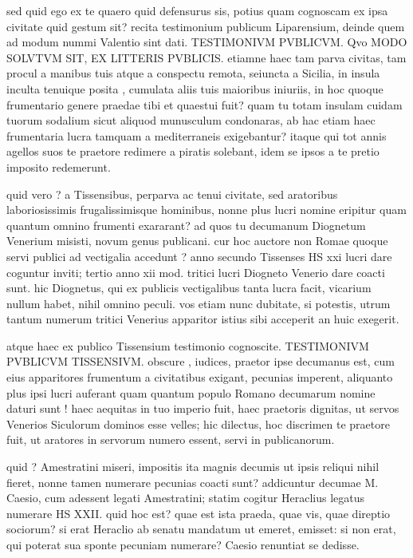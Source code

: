  sed quid ego ex te quaero quid defensurus sis, potius quam cognoscam ex ipsa civitate quid gestum sit? recita testimonium publicum Liparensium, deinde quem ad modum nummi Valentio sint dati. TESTIMONIVM PVBLICVM. Qvo MODO SOLVTVM SIT, EX LITTERIS PVBLICIS. etiamne haec tam parva civitas, tam procul a manibus tuis atque a conspectu remota, seiuncta a Sicilia, in insula inculta tenuique posita , cumulata aliis tuis maioribus iniuriis, in hoc quoque frumentario genere praedae tibi et quaestui fuit? quam tu totam insulam cuidam tuorum sodalium sicut aliquod munusculum condonaras, ab hac etiam haec frumentaria lucra tamquam a mediterraneis exigebantur? itaque qui tot annis agellos suos te praetore redimere a piratis solebant, idem se ipsos a te pretio imposito redemerunt.

 quid vero ? a Tissensibus, perparva ac tenui civitate, sed aratoribus laboriosissimis frugalissimisque hominibus, nonne plus lucri nomine eripitur quam quantum omnino frumenti exararant? ad quos tu decumanum Diognetum Venerium misisti, novum genus publicani. cur hoc auctore non Romae quoque servi publici ad vectigalia accedunt ? anno secundo Tissenses HS xxi lucri dare coguntur inviti; tertio anno xii mod. tritici lucri Diogneto Venerio dare coacti sunt. hic Diognetus, qui ex publicis vectigalibus tanta lucra facit, vicarium nullum habet, nihil omnino peculi. vos etiam nunc dubitate, si potestis, utrum tantum numerum tritici Venerius apparitor istius sibi acceperit an huic exegerit.

 atque haec ex publico Tissensium testimonio cognoscite. TESTIMONIVM PVBLICVM TISSENSIVM. obscure , iudices, praetor ipse decumanus est, cum eius apparitores frumentum a civitatibus exigant, pecunias imperent, aliquanto plus ipsi lucri auferant quam quantum populo Romano decumarum nomine daturi sunt ! haec aequitas in tuo imperio fuit, haec praetoris dignitas, ut servos Venerios Siculorum dominos esse velles; hic dilectus, hoc discrimen te praetore fuit, ut aratores in servorum numero essent, servi in publicanorum.

 quid ? Amestratini miseri, impositis ita magnis decumis ut ipsis reliqui nihil fieret, nonne tamen numerare pecunias coacti sunt? addicuntur decumae M. Caesio, cum adessent legati Amestratini; statim cogitur Heraclius legatus numerare HS XXII. quid hoc est? quae est ista praeda, quae vis, quae direptio sociorum? si erat Heraclio ab senatu mandatum ut emeret, emisset: si non erat, qui poterat sua sponte pecuniam numerare? Caesio renuntiat se dedisse.

